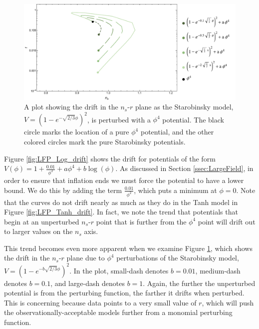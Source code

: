 \documentclass[a4paper,11pt]{article}
\def\nsr{$n_s$-$r$ }
\begin{document}
\begin{figure}[H]
	\centering
	\includegraphics[width=\textwidth]{figures/LFP_lines_Rsq_final.pdf}
	\caption[Drift in \nsr plane for Starobinsky model with perturbations.]{A plot showing the drift in the \nsr plane as the Starobinsky model, $V=(1-e^{-\sqrt{2/3}\phi})^2$, is perturbed with a $\phi^4$ potential. The black circle marks the location of a pure $\phi^4$ potential, and the other colored circles mark the pure Starobinsky potentials.}
	\label{fig:LFP_Rsq_drift}
\end{figure}

Figure \ref{fig:LFP_Log_drift} shows the drift for potentials of the form $V(\phi)=1+\tfrac{0.01}{\phi^2}+a\phi^4+b\log(\phi)$. As discussed in Section \ref{ssec:LargeField}, in order to ensure that inflation ends we must force the potential to have a lower bound. We do this by adding the term $\tfrac{0.01}{\phi^2}$, which puts a minimum at $\phi=0$. Note that the curves do not drift nearly as much as they do in the Tanh model in Figure \ref{fig:LFP_Tanh_drift}. In fact, we note the trend that potentials that begin at an unperturbed \nsr point that is further from the $\phi^4$ point will drift out to larger values on the $n_s$ axis. 

This trend becomes even more apparent when we examine Figure \ref{fig:LFP_Rsq_drift}, which shows the drift in the \nsr plane due to $\phi^4$ perturbations of the Starobinsky model, $V=(1-e^{-b\sqrt{2/3}\phi})^2$. In the plot, small-dash denotes $b=0.01$, medium-dash denotes $b=0.1$, and large-dash denotes $b=1$. Again, the further the unperturbed potential is from the perturbing function, the farther it drifts when perturbed. This is concerning because \citet{Planck2015} data points to a very small value of $r$, which will push the observationally-acceptable models further from a monomial perturbing function. 
\end{document}
